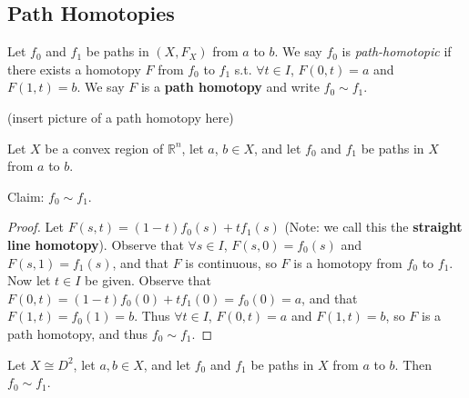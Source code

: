 \subsection{Path Homotopies}
\begin{definition}
 Let $f_0$ and $f_1$ be paths in $(X, F_X)$ from $a$ to $b$. We say $f_0$ is \textit{path-homotopic} if there exists a homotopy $F$ from $f_0$ to $f_1$ s.t. $\forall t \in I$, $F(0,t) = a$ and $F(1, t) = b$. We say $F$ is a \textbf{path homotopy} and write $f_0 \sim f_1$.
 \end{definition}
(insert picture of a path homotopy here)
\placeholder

\begin{example}
 Let $X$ be a convex region of $\mathbb{R}^n$, let $a$, $b \in X$, and let $f_0$ and $f_1$ be paths in $X$ from $a$ to $b$. 
\end{example}
Claim: $f_0 \sim f_1$.
\begin{proof}
 Let $F(s,t) = (1-t)f_0(s) + tf_1(s)$ (Note: we call this the \textbf{straight line homotopy}). Observe that $\forall s \in I$, $F(s,0) = f_0(s)$ and $F(s,1) = f_1(s)$, and that $F$ is continuous, so $F$ is a homotopy from $f_0$ to $f_1$. Now let $t \in I$ be given. Observe that $F(0,t) = (1-t)f_0(0) + tf_1(0) = f_0(0) = a$, and that $F(1, t) = f_0(1) = b$. Thus $\forall t \in I$, $F(0,t) = a$ and $F(1,t) = b$, so $F$ is a path homotopy, and thus $f_0 \sim f_1$. 
 \end{proof}
 
 
\begin{example}
 Let $X \cong D^2$, let $a, b \in X$, and let $f_0$ and $f_1$ be paths in $X$ from $a$ to $b$.  Then  $f_0 \sim f_1$.
 \end{example}


